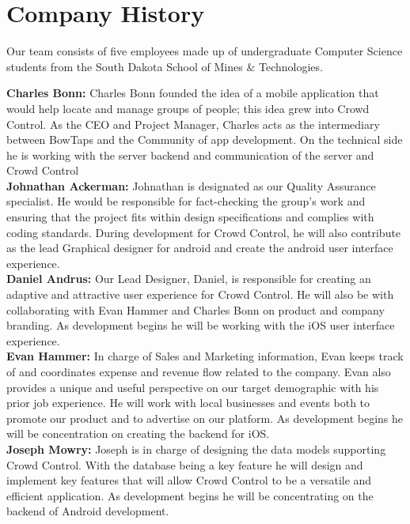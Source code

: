 \section{Company History}

Our team consists of five employees made up of undergraduate Computer Science students from the South Dakota School of Mines \& Technologies. 

\textbf{Charles Bonn:} Charles Bonn founded the idea of a mobile application that would help locate and manage groups of people; this idea grew into Crowd Control. As the CEO and Project Manager, Charles acts as the intermediary between BowTaps and the Community of app development. On the technical side he is working with the server backend and communication of the server and Crowd Control \\
\textbf{Johnathan Ackerman:} Johnathan is designated as our Quality Assurance specialist. He would be responsible for fact-checking the group’s work and ensuring that the project fits within design specifications and complies with coding standards. During development for Crowd Control, he will also contribute as the lead Graphical designer for android and create the android user interface experience.\\
\textbf{Daniel Andrus:} Our Lead Designer, Daniel, is responsible for creating an adaptive and attractive user experience for Crowd Control. He will also be with collaborating with Evan Hammer and Charles Bonn on product and company branding. As development begins he will be working with the iOS user interface experience.\\
\textbf{Evan Hammer:} In charge of Sales and Marketing information, Evan keeps track of and coordinates expense and revenue flow related to the company. Evan also provides a unique and useful perspective on our target demographic with his prior job experience. He will work with local businesses and events both to promote our product and to advertise on our platform. As development begins he will be concentration on creating the backend for iOS. \\
\textbf{Joseph Mowry:} Joseph is in charge of designing the data models supporting Crowd Control. With the database being a key feature he will design and implement key features that will allow Crowd Control to be a versatile and efficient application. As development begins he will be concentrating on the backend of Android development.\\






